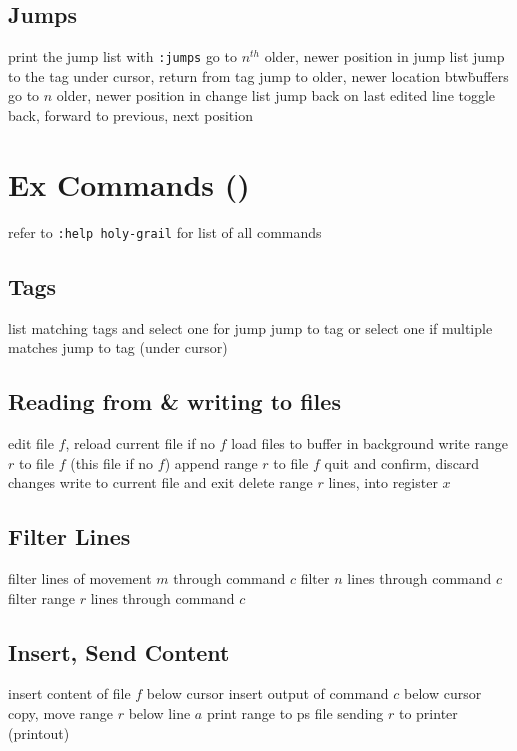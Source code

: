 \subsection{Jumps}	{print the jump list with {\tt :jumps}}
	{go to $n^{th}$ older, newer position in jump list}
\cmdS{\ctrl ] \ctrl T }	{jump to the tag under cursor, return from tag}
	{jump to older, newer location btw\. buffers}
	{go to $n$ older, newer position in change list}
	{jump back on last edited line}
	{toggle back, forward to previous, next position}

\section{Ex Commands (\enter)}	{refer to {\tt :help holy-grail} for list of all commands}
\subsection{Tags}	{}
	{list matching tags and select one for jump}
	{jump to tag or select one if multiple matches}
\cmdS{:ta\grey{g} \ctrl[ }	{jump to tag (under cursor)}

\subsection{Reading from \& writing to files}	{}
	{edit file $f$, reload current file if no $f$}
	{load files to buffer in background}
	{write range $r$ to file $f$ (this file if no $f$)}
	{append range $r$ to file $f$}
	{quit and confirm, discard changes}
	{write to current file and exit}
	{delete range $r$ lines, into register $x$}

\subsection{Filter Lines}{}
	{filter lines of movement $m$ through command $c$}
	{filter $n$ lines through command $c$}
	{filter range $r$ lines through command $c$}

\subsection{Insert, Send Content}	{}
	{insert content of file $f$ below cursor}
	{insert output of command $c$ below cursor}
	{copy, move range $r$ below line $a$}
	{print range to ps file}
	{sending $r$ to printer (printout)}

